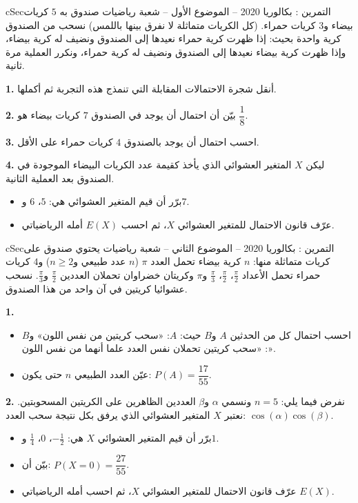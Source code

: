 \documentclass[12pt,a4paper]{article}
\newenvironment{BOX}[2]{\begin{otherlanguage}{english}\begin{arbox}{#1}{#2}}{\end{arbox}\end{otherlanguage}}
\newcounter{exo}
\newenvironment{tamrin}[1]{\stepcounter{exo}\begin{BOX}{cSec}{التمرين \theexo: #1}}{\end{BOX}}
\newenvironment{LTR}{\begin{otherlanguage}{english}}{\end{otherlanguage}}
\renewcommand{\ldots}{\mathinner{\ldotp\ldotp\ldotp}}
\newenvironment{sq}{\begin{itemize}[leftmargin=2.4em,itemsep=3pt]}{\end{itemize}}
\newcommand{\qa}{\item[(أ)]}\newcommand{\qb}{\item[(ب)]}\newcommand{\qc}{\item[(جـ)]}\newcommand{\qd}{\item[(د)]}\newcommand{\qe}{\item[(هـ)]}
\newcommand{\QQ}[1]{\par\smallskip\textbf{#1.} }
\begin{document}
\begin{tamrin}{بكالوريا 2020 -- الموضوع الأول -- شعبة رياضيات}
صندوق به $5$ كريات بيضاء و$3$ كريات حمراء. (كل الكريات متماثلة لا نفرق بينها باللمس)
نسحب من الصندوق كرية واحدة بحيث: إذا ظهرت كرية حمراء نعيدها إلى الصندوق ونضيف له كرية بيضاء، وإذا ظهرت كرية بيضاء نعيدها إلى الصندوق ونضيف له كرية حمراء، ونكرر العملية مرة ثانية.
\begin{center}\begin{LTR}\end{LTR}\end{center}
\QQ{1} أنقل شجرة الاحتمالات المقابلة التي تنمذج هذه التجربة ثم أكملها.
\QQ{2} بيّن أن احتمال أن يوجد في الصندوق $7$ كريات بيضاء هو $\dfrac18$.
\QQ{3} احسب احتمال أن يوجد بالصندوق $4$ كريات حمراء على الأقل.
\QQ{4} ليكن $X$ المتغير العشوائي الذي يأخذ كقيمة عدد الكريات البيضاء الموجودة في الصندوق بعد العملية الثانية.
\begin{sq}
\qa برّر أن قيم المتغير العشوائي هي: $5$، $6$ و$7$.
\qb عرّف قانون الاحتمال للمتغير العشوائي $X$، ثم احسب $E(X)$ أمله الرياضياتي.
\end{sq}
\end{tamrin}

\begin{tamrin}{بكالوريا 2020 -- الموضوع الثاني -- شعبة رياضيات}
يحتوي صندوق على كريات متماثلة منها: $n$ كرية بيضاء تحمل العدد $\pi$ ($n$ عدد طبيعي و$n\geqslant2$) و$4$ كريات حمراء تحمل الأعداد $\frac{\pi}{2}$، $\frac{\pi}{2}$، $\frac{\pi}{3}$ و$\pi$ وكريتان خضراوان تحملان العددين $\frac{\pi}{2}$ و$\frac{\pi}{3}$.
نسحب عشوائيا كريتين في آن واحد من هذا الصندوق.

\QQ{1}
\begin{sq}
\qa احسب احتمال كل من الحدثين $A$ و$B$ حيث: $A$: «سحب كريتين من نفس اللون» و$B$: «سحب كريتين تحملان نفس العدد علما أنهما من نفس اللون».
\qb عيّن العدد الطبيعي $n$ حتى يكون: $P(A)=\dfrac{17}{55}$.
\end{sq}
\QQ{2} نفرض فيما يلي: $n=5$ ونسمي $\alpha$ و$\beta$ العددين الظاهرين على الكريتين المسحوبتين.
نعتبر $X$ المتغير العشوائي الذي يرفق بكل نتيجة سحب العدد: $\cos(\alpha)\cos(\beta)$.
\begin{sq}
\qa برّر أن قيم المتغير العشوائي $X$ هي: $-\frac12$، $0$، $\frac14$ و$1$.
\qb بيّن أن: $P(X=0)=\dfrac{27}{55}$.
\qc عرّف قانون الاحتمال للمتغير العشوائي $X$، ثم احسب أمله الرياضياتي $E(X)$.
\end{sq}
\end{tamrin}
\end{document}
